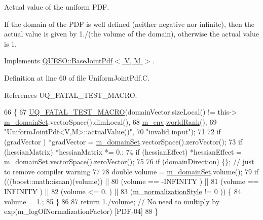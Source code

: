 Actual value of the uniform P\-D\-F. 

If the domain of the P\-D\-F is well defined (neither negative nor infinite), then the actual value is given by 1./(the volume of the domain), otherwise the actual value is 1. 

Implements \hyperlink{class_q_u_e_s_o_1_1_base_joint_pdf_a3c367a0cc3fb707a136c5df47dd414c1}{Q\-U\-E\-S\-O\-::\-Base\-Joint\-Pdf$<$ V, M $>$}.



Definition at line 60 of file Uniform\-Joint\-Pdf.\-C.



References U\-Q\-\_\-\-F\-A\-T\-A\-L\-\_\-\-T\-E\-S\-T\-\_\-\-M\-A\-C\-R\-O.


\begin{DoxyCode}
66 \{
67   \hyperlink{_defines_8h_a56d63d18d0a6d45757de47fcc06f574d}{UQ\_FATAL\_TEST\_MACRO}(domainVector.sizeLocal() != this->
      \hyperlink{class_q_u_e_s_o_1_1_base_scalar_function_a67696e86211197938c72cd11863f5cf8}{m\_domainSet}.vectorSpace().dimLocal(),
68                       \hyperlink{class_q_u_e_s_o_1_1_base_scalar_function_adf44141aeb765d97613286f88f235f04}{m\_env}.\hyperlink{class_q_u_e_s_o_1_1_base_environment_a78b57112bbd0e6dd0e8afec00b40ffa7}{worldRank}(),
69                       \textcolor{stringliteral}{"UniformJointPdf<V,M>::actualValue()"},
70                       \textcolor{stringliteral}{"invalid input"});
71 
72   \textcolor{keywordflow}{if} (gradVector   ) *gradVector     = \hyperlink{class_q_u_e_s_o_1_1_base_scalar_function_a67696e86211197938c72cd11863f5cf8}{m\_domainSet}.vectorSpace().zeroVector();
73   \textcolor{keywordflow}{if} (hessianMatrix) *hessianMatrix *= 0.;
74   \textcolor{keywordflow}{if} (hessianEffect) *hessianEffect  = \hyperlink{class_q_u_e_s_o_1_1_base_scalar_function_a67696e86211197938c72cd11863f5cf8}{m\_domainSet}.vectorSpace().zeroVector();
75 
76   \textcolor{keywordflow}{if} (domainDirection) \{\}; \textcolor{comment}{// just to remove compiler warning}
77 
78   \textcolor{keywordtype}{double} volume = \hyperlink{class_q_u_e_s_o_1_1_base_scalar_function_a67696e86211197938c72cd11863f5cf8}{m\_domainSet}.volume();
79   \textcolor{keywordflow}{if} (((boost::math::isnan)(volume)) ||
80       (volume == -INFINITY         ) ||
81       (volume ==  INFINITY         ) ||
82       (volume <= 0.                ) ||
83       (\hyperlink{class_q_u_e_s_o_1_1_base_joint_pdf_a138c99bcef7a67077d9612bddfdcb896}{m\_normalizationStyle} != 0   )) \{
84     volume = 1.;
85   \}
86 
87   \textcolor{keywordflow}{return} 1./volume; \textcolor{comment}{// No need to multiply by exp(m\_logOfNormalizationFactor) [PDF-04]}
88 \}
\end{DoxyCode}

